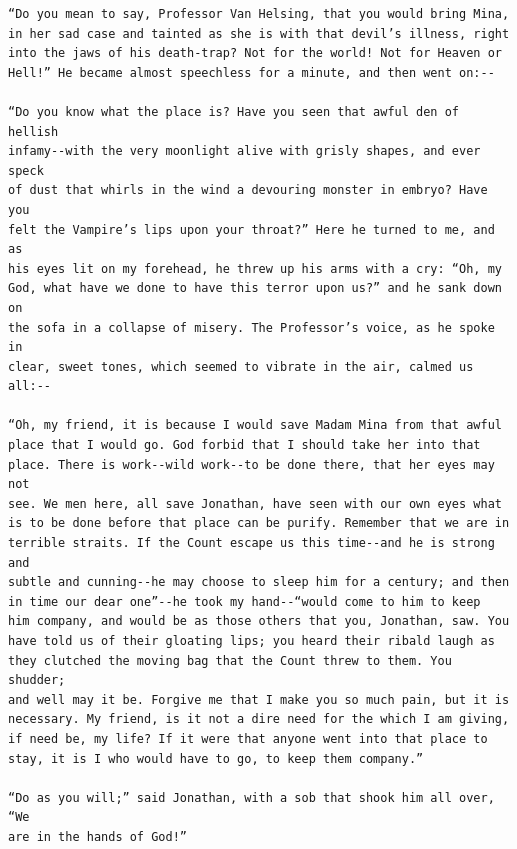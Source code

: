 \documentclass{article}
\begin{document}
\begin{verbatim}
“Do you mean to say, Professor Van Helsing, that you would bring Mina,
in her sad case and tainted as she is with that devil’s illness, right
into the jaws of his death-trap? Not for the world! Not for Heaven or
Hell!” He became almost speechless for a minute, and then went on:--

“Do you know what the place is? Have you seen that awful den of hellish
infamy--with the very moonlight alive with grisly shapes, and ever speck
of dust that whirls in the wind a devouring monster in embryo? Have you
felt the Vampire’s lips upon your throat?” Here he turned to me, and as
his eyes lit on my forehead, he threw up his arms with a cry: “Oh, my
God, what have we done to have this terror upon us?” and he sank down on
the sofa in a collapse of misery. The Professor’s voice, as he spoke in
clear, sweet tones, which seemed to vibrate in the air, calmed us all:--

“Oh, my friend, it is because I would save Madam Mina from that awful
place that I would go. God forbid that I should take her into that
place. There is work--wild work--to be done there, that her eyes may not
see. We men here, all save Jonathan, have seen with our own eyes what
is to be done before that place can be purify. Remember that we are in
terrible straits. If the Count escape us this time--and he is strong and
subtle and cunning--he may choose to sleep him for a century; and then
in time our dear one”--he took my hand--“would come to him to keep
him company, and would be as those others that you, Jonathan, saw. You
have told us of their gloating lips; you heard their ribald laugh as
they clutched the moving bag that the Count threw to them. You shudder;
and well may it be. Forgive me that I make you so much pain, but it is
necessary. My friend, is it not a dire need for the which I am giving,
if need be, my life? If it were that anyone went into that place to
stay, it is I who would have to go, to keep them company.”

“Do as you will;” said Jonathan, with a sob that shook him all over, “We
are in the hands of God!”


\end{verbatim}
\end{document}
